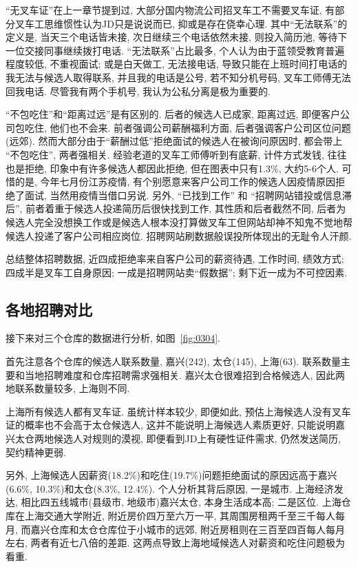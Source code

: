 ``无叉车证''在上一章节提到过, 大部分国内物流公司招叉车工不需要叉车证, 有部分叉车工思维惯性认为JD只是说说而已, 抑或是存在侥幸心理. 其中``无法联系''的定义是, 当天三个电话皆未接, 次日继续三个电话依然未接, 则投入简历池, 等待下一位交接同事继续拨打电话. ``无法联系''占比最多, 个人认为由于蓝领受教育普遍程度较低, 不重视面试; 或是白天做工, 无法接电话, 导致只能在上班时间打电话的我无法与候选人取得联系, 并且我的电话是公号, 若不知分机号码, 叉车工师傅无法回我电话. 尽管我有两个手机号, 我认为公私分离是极为重要的. 

``不包吃住''和``距离过远''是有区别的. 后者的候选人已成家, 距离过远, 即便客户公司包吃住, 他们也不会来. 前者强调公司薪酬福利方面, 后者强调客户公司区位问题(远郊). 然而大部分由于``薪酬过低''拒绝面试的候选人在被询问原因时, 都会带上 ``不包吃住'', 两者强相关. 经验老道的叉车工师傅听到有底薪, 计件方式发钱, 往往也是拒绝, 印象中有许多候选人都因此拒绝, 但在图表中只有1.3\%, 大约5-6个人. 可惜的是, 今年七月份江苏疫情, 有个别愿意来客户公司工作的候选人因疫情原因拒绝了面试, 当然用疫情当借口另说. 另外, ``已找到工作'' 和 ``招聘网站错投或信息滞后'', 前者着重于候选人投递简历后很快找到工作, 其性质和后者截然不同, 后者为候选人完全没想换工作或是候选人根本没打算做叉车工但网站却神不知鬼不觉地帮候选人投递了客户公司相应岗位. 招聘网站刷数据般误投所体现出的无耻令人汗颜. 

总结整体招聘数据, 近四成拒绝率来自客户公司的薪资待遇, 工作时间, 绩效方式; 四成半是叉车工自身原因; 一成是招聘网站卖``假数据''; 剩下近一成为不可控因素. 

\subsection{各地招聘对比}

接下来对三个仓库的数据进行分析, 如图~\ref{fig:0304}. 

首先注意各个仓库的候选人联系数量, 嘉兴(242), 太仓(145), 上海(63). 联系数量主要和当地招聘难度和仓库招聘需求强相关. 嘉兴太仓很难招到合格候选人, 因此两地联系数量较多, 上海则不同. 

上海所有候选人都有叉车证. 虽统计样本较少, 即便如此, 预估上海候选人没有叉车证的概率也不会高于太仓候选人, 这并不能说明上海候选人素质更好, 只能说明嘉兴太仓两地候选人对规则的漠视, 即便看到JD上有硬性证件需求, 仍然发送简历, 契约精神更弱.  

另外, 上海候选人因薪资(18.2\%)和吃住(19.7\%)问题拒绝面试的原因远高于嘉兴(6.6\%, 10.3\%)和太仓(8.3\%, 12.4\%). 个人分析其背后原因, 一是城市. 上海经济发达, 相比四五线城市(县级市, 地级市)嘉兴太仓, 本身生活成本高; 二是区位. 上海仓库在上海交通大学附近, 附近房价四万至六万一平, 其周围房租两千至三千每人每月, 而嘉兴仓库和太仓仓库位于小城市的远郊, 附近房租则在三百至四百每人每月左右, 两者有近七八倍的差距. 这两点导致上海地域候选人对薪资和吃住问题极为看重. 

